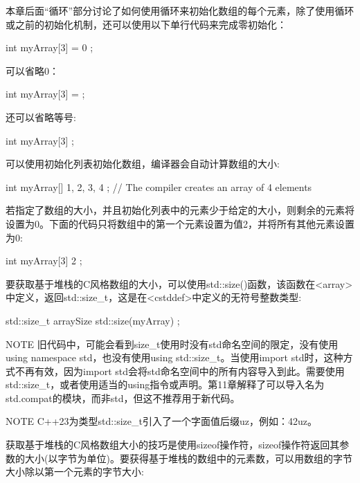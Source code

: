 本章后面“循环”部分讨论了如何使用循环来初始化数组的每个元素，除了使用循环或之前的初始化机制，还可以使用以下单行代码来完成零初始化：

\begin{cpp}
int myArray[3] = { 0 };
\end{cpp}

可以省略0：

\begin{cpp}
int myArray[3] = {};
\end{cpp}

还可以省略等号:

\begin{cpp}
int myArray[3] {};
\end{cpp}

可以使用初始化列表初始化数组，编译器会自动计算数组的大小:

\begin{cpp}
int myArray[] { 1, 2, 3, 4 }; // The compiler creates an array of 4 elements
\end{cpp}

若指定了数组的大小，并且初始化列表中的元素少于给定的大小，则剩余的元素将设置为0。下面的代码只将数组中的第一个元素设置为值2，并将所有其他元素设置为0:

\begin{cpp}
int myArray[3] { 2 };
\end{cpp}

要获取基于堆栈的C风格数组的大小，可以使用std::size()函数，该函数在<array>中定义，返回std::size\_t，这是在<cstddef>中定义的无符号整数类型:

\begin{cpp}
std::size_t arraySize { std::size(myArray) };
\end{cpp}

\begin{myNotic}{NOTE}
旧代码中，可能会看到size\_t使用时没有std命名空间的限定，没有使用using namespace std，也没有使用using std::size\_t。当使用import std时，这种方式不再有效，因为import std会将std命名空间中的所有内容导入到此。需要使用std::size\_t，或者使用适当的using指令或声明。第11章解释了可以导入名为std.compat的模块，而非std，但这不推荐用于新代码。
\end{myNotic}


\begin{myNotic}{NOTE}
C++23为类型std::size\_t引入了一个字面值后缀uz，例如：42uz。
\end{myNotic}

获取基于堆栈的C风格数组大小的技巧是使用sizeof操作符，sizeof操作符返回其参数的大小(以字节为单位)。要获得基于堆栈的数组中的元素数，可以用数组的字节大小除以第一个元素的字节大小:

